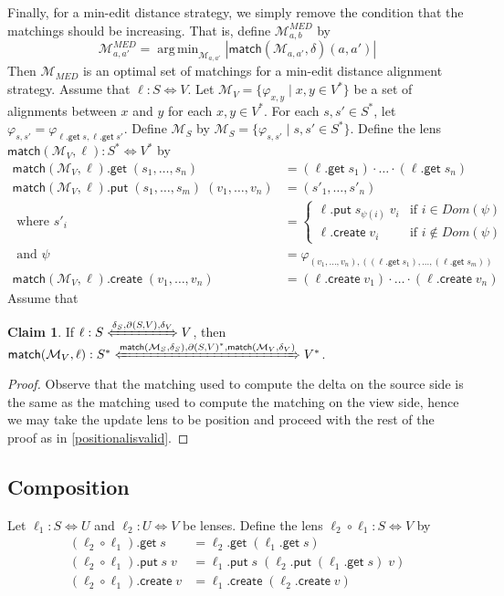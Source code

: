 \documentclass[acmsmall,review,anonymous]{acmart}\settopmatter{printfolios=true,printccs=false,printacmref=false}
\theoremstyle{definition}
\newtheorem{claim}{Claim}
\newcommand{\kw}[1]{\ensuremath{\mathsf{#1}}\xspace}
\newcommand{\get}{\ensuremath{\kw{get}}\xspace}
\newcommand{\pput}{\ensuremath{\kw{put}}\xspace}
\newcommand{\create}{\ensuremath{\kw{create}}\xspace}
\newcommand{\match}{\ensuremath{\kw{match}}\xspace}
\DeclareMathOperator*{\argmin}{arg\,min} %
\begin{document}
Finally, for a min-edit distance strategy, we simply remove the condition that
the matchings should be increasing. That is, define
$\mathcal{M}^{MED}_{a, b}$ by
$$\mathcal{M}^{MED}_{a, a'} = \argmin_{\mathcal{M}_{a, a'}}
|\match(\mathcal{M}_{a, a'}, \delta)(a, a')|$$
Then $\mathcal{M}_{MED}$ is an optimal set of matchings for a min-edit distance
alignment strategy.
\fi
Assume that $\ell: S \Leftrightarrow V$. Let $\mathcal{M}_V = \{\varphi_{x, y}
\; | \; x, y \in V^*\}$ be a set of alignments between $x$ and $y$ for each $x,
y \in V^*$. For each $s, s' \in S^*$, let $\varphi_{s, s'} = \varphi_{\ell.\get
\; s, \ell.\get \; s'}$. Define $\mathcal{M}_S$ by $\mathcal{M}_S =
\{\varphi_{s, s'} \; | \; s, s' \in S^*\}$. Define the lens
$\match(\mathcal{M}_V, \ell) : S^* \Leftrightarrow V^*$ by
\begin{align*}
\match(\mathcal{M}_V, \ell) .\get \; (s_1, \ldots, s_n) &= (\ell.\get \; s_1)
\cdot \ldots \cdot (\ell.\get \; s_n)\\
\match(\mathcal{M}_V, \ell) .\pput \; (s_1, \ldots, s_m) \; (v_1, \ldots, v_n)
&= (s'_1 , \ldots , s'_n)\\
\text{ where } s'_i &= \begin{cases}
\ell.\pput \; s_{\psi(i)} \; v_i & \text{if } i \in Dom(\psi)\\
\ell.\create \; v_i & \text{if } i \not \in Dom(\psi)
\end{cases}\\
\text{ and } \psi &= \varphi_{(v_1, \ldots, v_n), ((\ell.\get \; s_1), \ldots,
(\ell.\get \; s_m))}\\
\match(\mathcal{M}_V, \ell).\create \; (v_1, \ldots, v_n) &= (\ell.\create \;
v_1) \cdot \ldots \cdot (\ell.\create \; v_n)
\end{align*}
Assume that 
\begin{claim}
If $\ell: S \xLeftrightarrow{\delta_{S}, \partial (S, V), \delta_{V}}
V$, then $\match(\mathcal{M}_V, \ell) : S^*
\xLeftrightarrow{\match(\mathcal{M}_S, \delta_{S}), \partial (S, V)^*,
\match(\mathcal{M}_V, \delta_V)} V^*$.
\end{claim}
\begin{proof}
Observe that the matching used to compute the delta on the source side is
the same as the matching used to compute the matching on the view side, hence we
may take the update lens to be position and proceed with the rest of the proof
as in \cref{positionalisvalid}.
\end{proof}
\subsection{Composition}
Let $\ell_1 : S \Leftrightarrow U$ and $\ell_2 : U \Leftrightarrow V$ be lenses.
Define the lens $\ell_2 \circ \ell_1 : S \Leftrightarrow V$ by
\begin{align*}
(\ell_2 \circ \ell_1).\get \; s &= \ell_2.\get \; (\ell_1.\get \; s)\\
(\ell_2 \circ \ell_1).\pput \; s \; v &= \ell_1.\pput \; s \; (\ell_2.\pput \;
(\ell_1.\get \; s) \; v) \\
(\ell_2 \circ \ell_1).\create \; v &= \ell_1.\create \; (\ell_2.\create \; v)
\end{align*}
\end{document}
